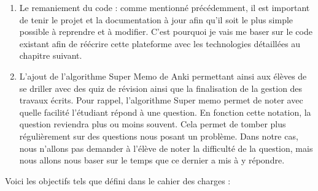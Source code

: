 \begin{enumerate}
    \item Le remaniement du code : comme mentionné précédemment, il est important de tenir le projet et la documentation à jour afin qu'il soit le plus simple possible à reprendre et à modifier. C'est pourquoi je vais me baser sur le code existant afin de réécrire cette plateforme avec les technologies détaillées au chapitre suivant.
    \item L'ajout de l'algorithme Super Memo de Anki permettant ainsi aux élèves de se driller avec des quiz de révision ainsi que la finalisation de la gestion des travaux écrits. Pour rappel, l'algorithme Super memo permet de noter avec quelle facilité l'étudiant répond à une question. En fonction cette notation, la question reviendra plus ou moins souvent. Cela permet de tomber plus régulièrement sur des questions nous posant un problème. Dans notre cas, nous n'allons pas demander à l'élève de noter la difficulté de la question, mais nous allons nous baser sur le temps que ce dernier a mis à y répondre.
\end{enumerate}

Voici les objectifs tels que défini dans le cahier des charges :
